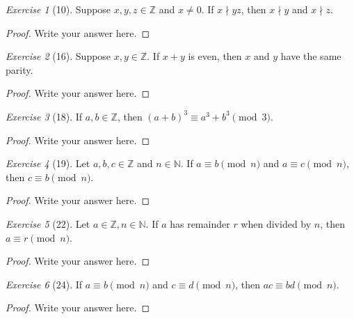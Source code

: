 \documentclass[12pt]{amsart}
\theoremstyle{remark}
\newtheorem*{exercise}{Exercise}%
\def\NN{\ensuremath{\mathbb N}}
\def\ZZ{\ensuremath{\mathbb Z}}
\theoremstyle{mycomment}
\begin{document}
\begin{exercise}[10] Suppose $x,y,z\in\ZZ$ and $x\ne 0$. %
If $x\nmid yz$, then $x\nmid y$ and $x\nmid z$.
\begin{proof}
Write your answer here.
\end{proof}
\end{exercise}

\begin{exercise}[16] Suppose $x,y\in\ZZ$. If $x+y$ is even, then $x$ and $y$ have the same parity.
\begin{proof}
Write your answer here.
\end{proof}
\end{exercise}

\begin{exercise}[18] If $a,b\in\ZZ$, then $(a+b)^{3}\equiv a^{3}+b^{3}\pmod 3$. %
\begin{proof}
Write your answer here.
\end{proof}
\end{exercise}

\begin{exercise}[19] Let $a,b,c\in\ZZ$ and $n\in\NN$. If $a\equiv b\pmod n$ and $a\equiv c\pmod n$, then $c\equiv b\pmod n$.
\begin{proof}
Write your answer here.
\end{proof}
\end{exercise}

\begin{exercise}[22] Let $a\in\ZZ, n\in\NN$. If $a$ has remainder $r$ when divided by $n$, then $a\equiv r\pmod n$.
\begin{proof}
Write your answer here.
\end{proof}
\end{exercise}

\begin{exercise}[24] If $a\equiv b\pmod n$ and $c\equiv d\pmod n$, then $ac\equiv bd\pmod n$.
\begin{proof}
Write your answer here.
\end{proof}
\end{exercise}
\end{document}
